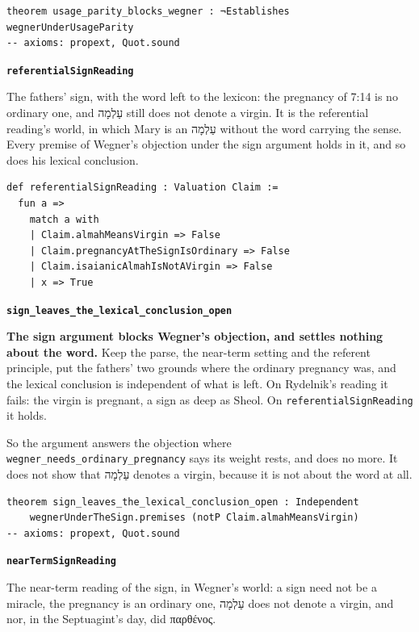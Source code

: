 \documentclass[11pt]{article}
\begin{document}
{\small\begin{verbatim}
theorem usage_parity_blocks_wegner : ¬Establishes wegnerUnderUsageParity
-- axioms: propext, Quot.sound
\end{verbatim}}
\par\medskip\noindent\textbf{\texttt{referential\allowbreak{}Sign\allowbreak{}Reading}}\par\nobreak\noindent
The fathers’ sign, with the word left to the lexicon: the pregnancy of 7:14 is no ordinary one, and עַלְמָה still does not denote a virgin. It is the referential reading’s world, in which Mary is an עַלְמָה without the word carrying the sense. Every premise of Wegner’s objection under the sign argument holds in it, and so does his lexical conclusion.

{\small\begin{verbatim}
def referentialSignReading : Valuation Claim :=
  fun a =>
    match a with
    | Claim.almahMeansVirgin => False
    | Claim.pregnancyAtTheSignIsOrdinary => False
    | Claim.isaianicAlmahIsNotAVirgin => False
    | x => True
\end{verbatim}}
\par\medskip\noindent\textbf{\texttt{sign\_\allowbreak{}leaves\_\allowbreak{}the\_\allowbreak{}lexical\_\allowbreak{}conclusion\_\allowbreak{}open}}\par\nobreak\noindent
\textbf{The sign argument blocks Wegner’s objection, and settles nothing about the word.} Keep the parse, the near-term setting and the referent principle, put the fathers’ two grounds where the ordinary pregnancy was, and the lexical conclusion is independent of what is left. On Rydelnik’s reading it fails: the virgin is pregnant, a sign as deep as Sheol. On \texttt{referential\allowbreak{}Sign\allowbreak{}Reading} it holds.

So the argument answers the objection where \texttt{wegner\_\allowbreak{}needs\_\allowbreak{}ordinary\_\allowbreak{}pregnancy} says its weight rests, and does no more. It does not show that עַלְמָה denotes a virgin, because it is not about the word at all.

{\small\begin{verbatim}
theorem sign_leaves_the_lexical_conclusion_open : Independent
    wegnerUnderTheSign.premises (notP Claim.almahMeansVirgin)
-- axioms: propext, Quot.sound
\end{verbatim}}
\par\medskip\noindent\textbf{\texttt{near\allowbreak{}Term\allowbreak{}Sign\allowbreak{}Reading}}\par\nobreak\noindent
The near-term reading of the sign, in Wegner’s world: a sign need not be a miracle, the pregnancy is an ordinary one, עַלְמָה does not denote a virgin, and nor, in the Septuagint’s day, did παρθένος.
\end{document}

